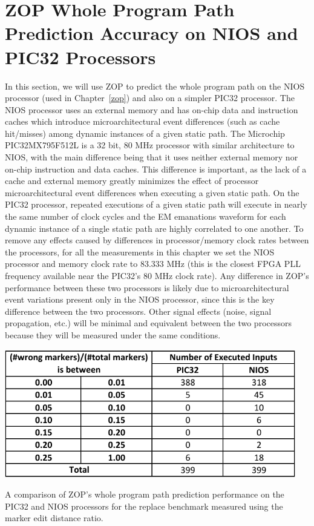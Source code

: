 \section{ZOP Whole Program Path Prediction Accuracy on NIOS and PIC32 Processors}
\label{malware-dist-static}
In this section, we will use ZOP to predict the whole program path on the NIOS processor (used in Chapter~\ref{zop}) and also on a simpler PIC32 processor. The NIOS processor uses an external memory and has on-chip data and instruction caches which introduce microarchitectural event differences (such as cache hit/misses) among dynamic instances of a given static path. The Microchip PIC32MX795F512L is a 32 bit, 80 MHz processor with similar architecture to NIOS, with the main difference being that it uses neither external memory nor on-chip instruction and data caches. This difference is important, as the lack of a cache and external memory greatly minimizes the effect of processor microarchitectural event differences when executing a given static path. On the PIC32 processor, repeated executions of a given static path will execute in nearly the same number of clock cycles and the EM emanations waveform for each dynamic instance of a single static path are highly correlated to one another. To remove any effects caused by differences in processor/memory clock rates between the processors, for all the measurements in this chapter we set the NIOS processor and memory clock rate to 83.333 MHz (this is the closest FPGA PLL frequency available near the PIC32's 80 MHz clock rate). Any difference in ZOP's performance between these two processors is likely due to microarchitectural event variations present only in the NIOS processor, since this is the key difference between the two processors. Other signal effects (noise, signal propagation, etc.) will be minimal and equivalent between the two processors because they will be measured under the same conditions. 

\begin{table}[hbt]
\includegraphics[width=5in]{pic32_performance}
\caption{A comparison of ZOP's whole program path prediction performance on the PIC32 and NIOS processors for the replace benchmark measured using the marker edit distance ratio.}
\label{pic32_performance}
\end{table}

